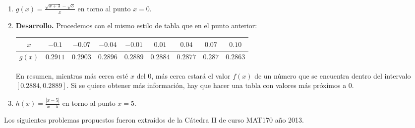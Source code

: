 \documentclass[10pt]{article}
\newcommand{\2}[1]{\hspace{-0.93cm}\colorbox{color1}{\hspace{0.07cm} \parbox{17cm}{\vspace{0.2cm} #1}\hspace*{0.07cm} }}
\newcommand{\3}[1]{\hspace{-0.93cm}\colorbox{color7}{\hspace{0.07cm} \parbox{17cm}{\vspace{0.2cm} #1}\hspace*{0.07cm} }}
\theoremstyle{theorem}
\numberwithin{equation}{section}
\newcommand{\dis}{\displaystyle}
\begin{document}
\begin{enumerate}[P1.]
\begin{enumerate}[1.]
\begin{table}[h!]
\begin{tabular}{|c |c| c| c| c| c| c| c| c| c |}
   \hline
   \end{tabular}
   \end{table}
   En resumen, mientras m\'as cerca est\'e $x$ del $2$, m\'as cerca estar\'a el valor $f(x)$ del 8.%
     \item $\dis g(x)=\frac{\sqrt{x+3}-\sqrt{3}}{x}$ en torno al punto $x=0$.
     \item[] \textbf{Desarrollo.}
     Procedemos con el mismo estilo de tabla que en el punto anterior:
   \begin{table}[h!]
   \centering
   \begin{tabular}{|c |c| c| c| c| c| c| c| c| } 
   \hline
     $x$   &  $-0.1$ & $-0.07$&$-0.04$&$-0.01$&$0.01$&$0.04$&$0.07$ &$0.10$  \\ %
   \hline
   $g(x)$ &   $0.2911$ & $0.2903$&$0.2896$&$0.2889$& $0.2884$&$0.2877$&$0.287$ &$0.2863$  \\%
   \hline
   \end{tabular}
   \end{table}
    En resumen, mientras m\'as cerca est\'e $x$ del $0$, m\'as cerca estar\'a el valor $f(x)$ de un n\'umero que se encuentra dentro del intervalo $[0.2884,0.2889]$. Si se quiere obtener m\'as informaci\'on, hay que hacer una tabla con valores m\'as pr\'oximos a $0$.
     \item $\dis h(x)=\frac{|x-5|}{x-5}$ en torno al punto $x=5$.
  \end{enumerate}
\end{enumerate}

Los siguientes problemas propuestos fueron extra\'idos de la C\'atedra II de curso MAT170 a\~no 2013.
\end{document}
